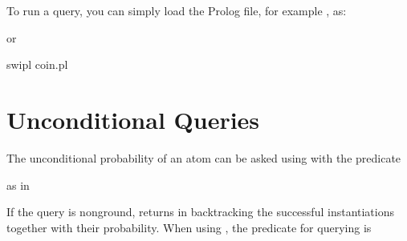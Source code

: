 \documentclass[letterpaper,10pt,english]{sphinxmanual}
\begin{document}
\sphinxAtStartPar
To run a query, you can simply load the Prolog file, for example , as:

\begin{sphinxVerbatim}[commandchars=\\\{\}]
 \PYG{p}{[}\PYG{p}{]}
\end{sphinxVerbatim}

\sphinxAtStartPar
or

\begin{sphinxVerbatim}[commandchars=\\\{\}]
swipl coin.pl
\end{sphinxVerbatim}


\section{Unconditional Queries}
\label{\detokenize{index:unconditional-queries}}
\sphinxAtStartPar
The unconditional probability of an atom can be asked using  with the predicate

\begin{sphinxVerbatim}[commandchars=\\\{\}]
  
\end{sphinxVerbatim}

\sphinxAtStartPar
as in

\begin{sphinxVerbatim}[commandchars=\\\{\}]
 
\end{sphinxVerbatim}

\sphinxAtStartPar
If the query is non\sphinxhyphen{}ground,  returns in backtracking the successful instantiations together with their probability.
When using , the predicate for querying is

\begin{sphinxVerbatim}[commandchars=\\\{\}]
  
\end{sphinxVerbatim}
\end{document}
